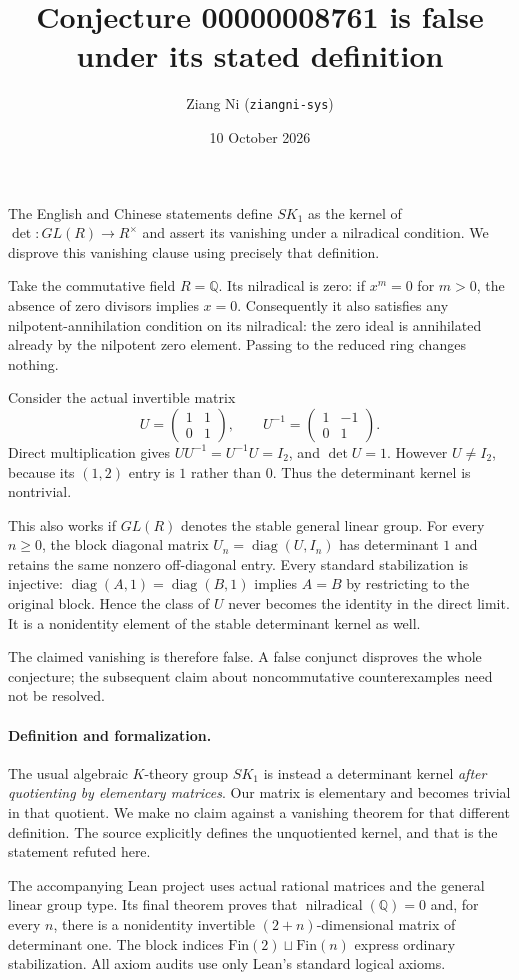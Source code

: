 \documentclass[11pt]{article}
\title{Conjecture 00000008761 is false under its stated definition}
\author{Ziang Ni (\texttt{ziangni-sys})}
\date{10 October 2026}
\begin{document}
\maketitle
The English and Chinese statements define $SK_1$ as the kernel of
$\det:GL(R)\longrightarrow R^\times$ and assert its vanishing under a
nilradical condition. We disprove this vanishing clause using precisely
that definition.

Take the commutative field $R=\mathbb Q$. Its nilradical is zero: if
$x^m=0$ for $m>0$, the absence of zero divisors implies $x=0$.
Consequently it also satisfies any nilpotent-annihilation condition on
its nilradical: the zero ideal is annihilated already by the nilpotent
zero element. Passing to the reduced ring changes nothing.

Consider the actual invertible matrix
\[
 U=\begin{pmatrix}1&1\\0&1\end{pmatrix},\qquad
 U^{-1}=\begin{pmatrix}1&-1\\0&1\end{pmatrix}.
\]
Direct multiplication gives $UU^{-1}=U^{-1}U=I_2$, and
$\det U=1$. However $U\ne I_2$, because its $(1,2)$ entry is $1$
rather than $0$. Thus the determinant kernel is nontrivial.

This also works if $GL(R)$ denotes the stable general linear group.
For every $n\geq0$, the block diagonal matrix
$U_n=\operatorname{diag}(U,I_n)$ has determinant $1$ and retains the same
nonzero off-diagonal entry. Every standard stabilization is injective:
$\operatorname{diag}(A,1)=\operatorname{diag}(B,1)$ implies $A=B$
by restricting to the original block. Hence the class of $U$ never
becomes the identity in the direct limit. It is a nonidentity element of
the stable determinant kernel as well.

The claimed vanishing is therefore false. A false conjunct disproves
the whole conjecture; the subsequent claim about noncommutative
counterexamples need not be resolved.

\paragraph{Definition and formalization.}
The usual algebraic $K$-theory group $SK_1$ is instead a determinant
kernel \emph{after quotienting by elementary matrices}. Our matrix is
elementary and becomes trivial in that quotient. We make no claim
against a vanishing theorem for that different definition. The source
explicitly defines the unquotiented kernel, and that is the statement
refuted here.

The accompanying Lean project uses actual rational matrices and
the general linear group type. Its final theorem proves that
$\operatorname{nilradical}(\mathbb Q)=0$ and, for every $n$, there is a
nonidentity invertible $(2+n)$-dimensional matrix of determinant one.
The block indices $\mathrm{Fin}(2)\sqcup\mathrm{Fin}(n)$ express ordinary
stabilization. All axiom audits use only Lean's standard logical axioms.
\end{document}
